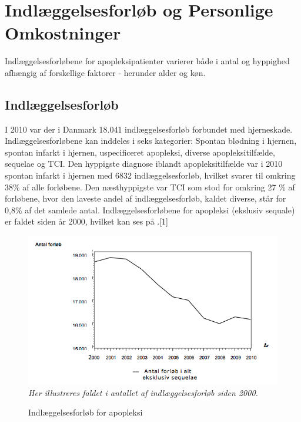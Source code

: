 \section{Indlæggelsesforløb og Personlige Omkostninger}
Indlæggelsesforløbene for apopleksipatienter varierer både i antal og hyppighed afhængig af forskellige faktorer - herunder alder og køn.

\subsection{Indlæggelsesforløb}
I 2010 var der i Danmark 18.041 indlæggelsesforløb forbundet med hjerneskade. Indlæggelsesforløbene kan inddeles i seks kategorier: Spontan blødning i hjernen, spontan infarkt i hjernen, uspecificeret apopleksi, diverse apopleksitilfælde, sequelae og TCI.  Den hyppigste diagnose iblandt apopleksitilfælde var i 2010 spontan infarkt i hjernen med 6832 indlæggelsesforløb, hvilket svarer til omkring 38\% af alle forløbene. Den næsthyppigste var TCI som stod for omkring 27 \% af forløbene, hvor den laveste andel af indlæggelsesforløb, kaldet diverse, står for 0,8\% af det samlede antal.  Indlæggelsesforløbene for apopleksi (ekslusiv sequale) er faldet siden år 2000, hvilket kan ses på .[1]

\begin{figure}[H]
	\caption{Indlæggelsesforløb for apopleksi}
	\label{Indlaeggelser}
	\centering
	\includegraphics[scale=.5]{figures/bProblemanalyse/Figur1}
	\flushleft
	\textit{Her illustreres faldet i antallet af indlæggelsesforløb siden 2000.}
\end{figure}


